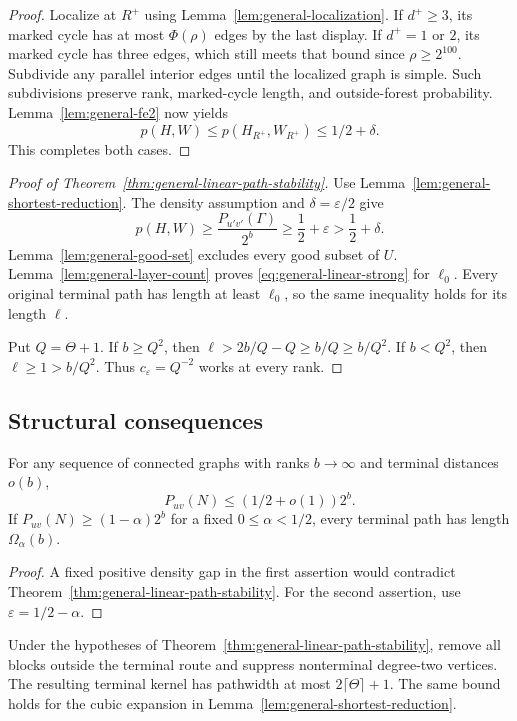 \begin{proof}
Localize at $R^+$ using Lemma~\ref{lem:general-localization}.
If $d^+\ge3$, its marked cycle has at most $\Phi(\rho)$ edges by the last display.
If $d^+=1$ or $2$, its marked cycle has three edges, which still meets that bound since $\rho\ge2^{100}$.
Subdivide any parallel interior edges until the localized graph is simple.
Such subdivisions preserve rank, marked-cycle length, and outside-forest probability.
Lemma~\ref{lem:general-fe2} now yields
\[
 p(H,W)\le p(H_{R^+},W_{R^+})\le1/2+\delta.
\]
This completes both cases.
\end{proof}

\begin{proof}[Proof of Theorem~\ref{thm:general-linear-path-stability}]
Use Lemma~\ref{lem:general-shortest-reduction}.
The density assumption and $\delta=\varepsilon/2$ give
\[
 p(H,W)\ge\frac{P_{u'v'}(\Gamma)}{2^b}
 \ge\frac12+\varepsilon>\frac12+\delta.
\]
Lemma~\ref{lem:general-good-set} excludes every good subset of $U$.
Lemma~\ref{lem:general-layer-count} proves \eqref{eq:general-linear-strong} for $\ell_0$.
Every original terminal path has length at least $\ell_0$, so the same inequality holds for its length $\ell$.

Put $Q=\Theta+1$.
If $b\ge Q^2$, then $\ell>2b/Q-Q\ge b/Q\ge b/Q^2$.
If $b<Q^2$, then $\ell\ge1>b/Q^2$.
Thus $c_\varepsilon=Q^{-2}$ works at every rank.
\end{proof}

\subsection{Structural consequences}

\begin{corollary}\label{cor:general-short-path-density}
For any sequence of connected graphs with ranks $b\to\infty$ and terminal distances $o(b)$,
\[
 P_{uv}(N)\le(1/2+o(1))2^b.
\]
If $P_{uv}(N)\ge(1-\alpha)2^b$ for a fixed $0\le\alpha<1/2$, every terminal path has length
$\Omega_\alpha(b)$.
\end{corollary}

\begin{proof}
A fixed positive density gap in the first assertion would contradict Theorem~\ref{thm:general-linear-path-stability}.
For the second assertion, use $\varepsilon=1/2-\alpha$.
\end{proof}

\begin{corollary}\label{cor:general-bounded-pathwidth}
Under the hypotheses of Theorem~\ref{thm:general-linear-path-stability}, remove all blocks outside the terminal route and suppress nonterminal degree-two vertices.
The resulting terminal kernel has pathwidth at most $2\lceil\Theta\rceil+1$.
The same bound holds for the cubic expansion in Lemma~\ref{lem:general-shortest-reduction}.
\end{corollary}

